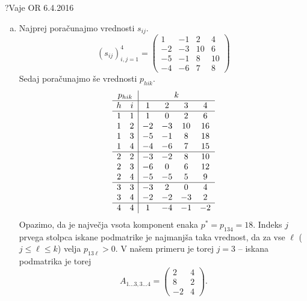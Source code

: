 \begin{naloga}{?}{Vaje OR 6.4.2016}
\begin{odgovor}
\begin{enumerate}[(a)]
\item Najprej poračunajmo vrednosti $s_{ij}$.
$$
(s_{ij})_{i,j=1}^4 = \begin{pmatrix}
 1 & -1 &  2 &  4 \\
-2 & -3 & 10 &  6 \\
-5 & -1 &  8 & 10 \\
-4 & -6 &  7 &  8
\end{pmatrix}
$$
Sedaj poračunajmo še vrednosti $p_{hik}$.
$$
\begin{array}{cc|cccc}
\multicolumn{2}{c|}{p_{hik}} & \multicolumn{4}{c}{k} \\ \hline
h & i &  1 &  2 &  3 &  4 \\ \hline
1 & 1 &  1 &  0 &  2 &  6 \\
1 & 2 & -2 & -3 & 10 & 16 \\
1 & 3 & -5 & -1 &  8 & 18 \\
1 & 4 & -4 & -6 &  7 & 15 \\ \hline
2 & 2 & -3 & -2 &  8 & 10 \\
2 & 3 & -6 &  0 &  6 & 12 \\
2 & 4 & -5 & -5 &  5 &  9 \\ \hline
3 & 3 & -3 &  2 &  0 &  4 \\
3 & 4 & -2 & -2 & -3 &  2 \\ \hline
4 & 4 &  1 & -4 & -1 & -2
\end{array}
$$
Opazimo, da je največja vsota komponent enaka $p^* = p_{134} = 18$.
Indeks $j$ prvega stolpca iskane podmatrike je najmanjša taka vrednost,
da za vse $\ell$ ($j \le \ell \le k$) velja $p_{13\ell} > 0$.
V našem primeru je torej $j = 3$
-- iskana podmatrika je torej
$$
A_{1 \dots 3, 3 \dots 4} = \begin{pmatrix}
 2 &  4 \\
 8 &  2 \\
-2 &  4
\end{pmatrix} .
$$


\end{enumerate}
\end{odgovor}
\end{naloga}
